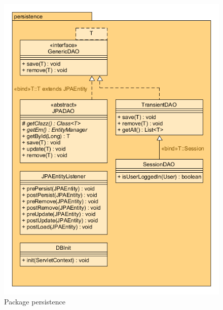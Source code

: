 \begin{figure}[H] \label{per}
\includegraphics[width=\textwidth]{../UMLDiagramme/persistence/gfx/4_package_persistence_part_0.png}
	\caption{Package persistence}
\end{figure}


